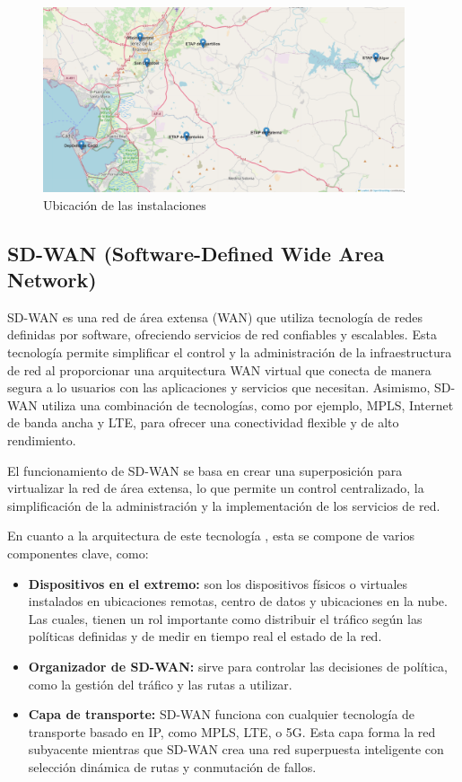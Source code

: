 \begin{figure}[H]
	\centering
	\includegraphics[width=0.95\textwidth]{images/mapa_sedes.png}
	\caption{Ubicación de las instalaciones}
	\label{fig:mapa_sedes}
\end{figure}

\subsection{SD-WAN (Software-Defined Wide Area Network)}
SD-WAN \cite{versa_sdwan} es una red de área extensa (WAN) que utiliza tecnología de redes definidas por software, ofreciendo servicios de red confiables y escalables. Esta tecnología permite simplificar el control y la administración de la infraestructura de red al proporcionar una arquitectura WAN virtual que conecta de manera segura a lo usuarios con las aplicaciones y servicios que necesitan. Asimismo, SD-WAN utiliza una combinación de tecnologías, como por ejemplo, MPLS, Internet de banda ancha y LTE, para ofrecer una conectividad flexible y de alto rendimiento. 

\vspace{0.5cm}
El funcionamiento de SD-WAN se basa en crear una superposición para virtualizar la red de área extensa, lo que permite un control centralizado, la simplificación de la administración y la implementación de los servicios de red.

\vspace{0.5cm}
\noindent
En cuanto a la arquitectura de este tecnología \cite{hpe_sdwan}, esta se compone de varios componentes clave, como:
\begin{itemize}
  \item \textbf{Dispositivos en el extremo:} son los dispositivos físicos o virtuales instalados en ubicaciones remotas, centro de datos y ubicaciones en la nube. Las cuales, tienen un rol importante como distribuir el tráfico según las políticas definidas y de medir en tiempo real el estado de la red.
  \item \textbf{Organizador de SD-WAN:} sirve para controlar las decisiones de política, como la gestión del tráfico y las rutas a utilizar.
  \item \textbf{Capa de transporte:} SD-WAN funciona con cualquier tecnología de transporte basado en IP, como MPLS, LTE, o 5G. Esta capa forma la red subyacente mientras que SD-WAN crea una red superpuesta inteligente con selección dinámica de rutas y conmutación de fallos. 
\end{itemize}

